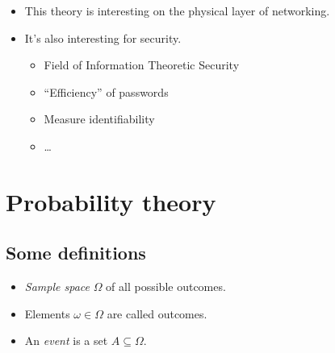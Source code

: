 \documentclass{beamer}
\begin{document}
\begin{frame}
  \begin{itemize}
    \item This theory is interesting on the physical layer of networking.

      \pause{}

    \item It's also interesting for security.
      \begin{itemize}
        \item Field of Information Theoretic Security
        \item \enquote{Efficiency} of passwords
        \item Measure identifiability
        \item \dots
      \end{itemize}
  \end{itemize}
\end{frame}


\section{Probability theory}

\subsection{Some definitions}

\begin{frame}
  \begin{definition}[Outcome]
    \begin{itemize}
      \item \emph{Sample space} \(\Omega\) of all possible outcomes.
      \item Elements \(\omega\in \Omega\) are called outcomes.
      \item An \emph{event} is a set \(A\subseteq \Omega\).
    \end{itemize}
  \end{definition}
\end{frame}
\end{document}
